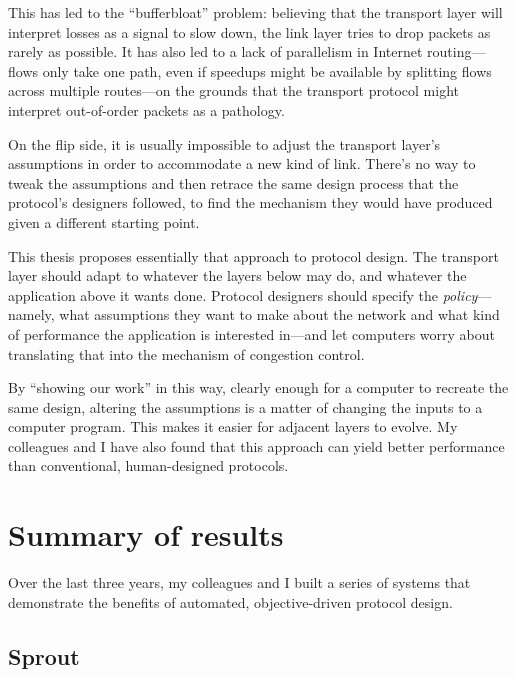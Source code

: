 This has led to the ``bufferbloat''\cite{bufferbloat} problem:
believing that the transport layer will interpret losses as a
signal to slow down, the link layer tries to drop packets as
rarely as possible. It has also led to a lack of parallelism in
Internet routing---flows only take one path, even if speedups might be
available by splitting flows across multiple routes---on the grounds
that the transport protocol might interpret out-of-order packets
as a pathology.

On the flip side, it is usually impossible to adjust the transport
layer's assumptions in order to accommodate a new kind of
link. There's no way to tweak the assumptions and then retrace the
same design process that the protocol's designers followed, to find the
mechanism they would have produced given a different starting point.


This thesis proposes essentially that approach to protocol design. The
transport layer should adapt to whatever the layers below may do, and
whatever the application above it wants done. Protocol designers
should specify the \emph{policy}---namely, what assumptions they want
to make about the network and what kind of performance the application
is interested in---and let computers worry about translating that into
the mechanism of congestion control.

By ``showing our work'' in this way, clearly enough for a computer to
recreate the same design, altering the assumptions is a matter of
changing the inputs to a computer program. This makes it easier for
adjacent layers to evolve. My colleagues and I have also found that
this approach can yield better performance than conventional,
human-designed protocols.

\section{Summary of results}

Over the last three years, my colleagues and I built a series of
systems that demonstrate the benefits of automated, objective-driven
protocol design.

\subsection{Sprout}

